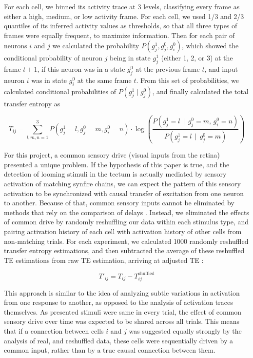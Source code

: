 \documentclass{article}
\begin{document}
For each cell, we binned its activity trace at 3 levels, classifying every frame as either a high, medium, or low activity frame. For each cell, we used 1/3 and 2/3 quantiles of its inferred activity values as thresholds, so that all three types of frames were equally frequent, to maximize information. Then for each pair of neurons $i$ and $j$ we calculated the probability $P(g_j^1,g_j^0,g_i^0)$, which showed the conditional probability of neuron $j$ being in state $g_j^1$ (either 1, 2, or 3) at the frame $t+1$, if this neuron was in a state $g_j^0$ at the previous frame $t$, and  input neuron $i$ was in state $g_i^0$ at the same frame $t$. From this set of probabilities, we calculated conditional probabilities of $P(g_j^1 \mid g_j^0)$, and finally calculated the total transfer entropy as

\[ T_{ij} = \sum_{l,m,n=1}^3{P(g_j^1=l,g_j^0=m,g_i^0=n)}\cdot \log\left(\frac{P(g_j^1=l \, \mid \, g_j^0=m, \, g_i^0=n)}{P(g_j^1=l \, \mid \, g_j^0=m)}\right) \]

For this project, a common sensory drive (visual inputs from the retina) presented a unique problem. If the hypothesis of this paper is true, and the detection of looming stimuli in the tectum is actually mediated by sensory activation of matching synfire chains, we can expect the pattern of this sensory activation to be synchronized with causal transfer of excitation from one neuron to another. Because of that, common sensory inputs cannot be eliminated by methods that rely on the comparison of delays \citep{wollstadt2014te}. Instead, we eliminated the effects of common drive by randomly reshuffling our data within each stimulus type, and pairing activation history of each cell with activation history of other cells from non-matching trials. For each experiment, we calculated 1000 randomly reshuffled transfer entropy estimations, and then subtracted the average of these reshuffled TE estimations from raw TE estimation, arriving at adjusted TE \citep{gourevitch2007te}:

\[ T'_{ij} = T_{ij} - T^\text{shuffled}_{ij} \]

This approach is similar to the idea of analyzing subtle variations in activation from one response to another, as opposed to the analysis of activation traces themselves. As presented stimuli were same in every trial, the effect of common sensory drive over time was expected to be shared across all trials. This means that if a connection between cells $i$ and $j$ was suggested equally strongly by the analysis of real, and reshuffled data, these cells were sequentially driven by a common input, rather than by a true causal connection between them.
\end{document}

